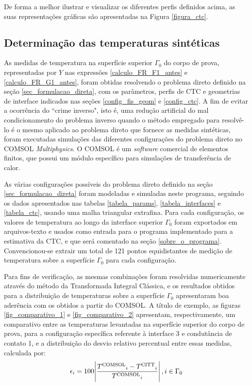 De forma a melhor ilustrar e visualizar os diferentes perfis definidos acima, as suas representações gráficas são apresentadas na Figura \ref{figura_ctc}.
\newpage



\subsection{Determinação das temperaturas sintéticas}

As medidas de temperatura na superfície superior $\Gamma_0$ do corpo de prova, representadas por $Y$ nas expressões \eqref{calculo_FR_F1_antes} e \eqref{calculo_FR_G1_antes}, foram obtidas resolvendo o problema direto definido na seção \ref{sec_formulacao_direta}, com os parâmetros, perfis de CTC e geometrias de interface indicados nas seções \ref{config_fis_geom} e \ref{config_ctc}. A fim de evitar a ocorrência do ``crime inverso", isto é, uma redução artificial do mal condicionamento do problema inverso quando o método empregado para resolvê-lo é o mesmo aplicado ao problema direto que fornece as medidas sintéticas\citep{livro_kaipio}, foram executadas simulações das diferentes configurações do problema direto no COMSOL \textit{Multiphysics}\textsuperscript{\textregistered}. O COMSOL é um \textit{software} comercial de elementos finitos, que possui um módulo específico para simulações de transferência de calor.

As várias configurações possíveis do problema direto definido na seção \ref{sec_formulacao_direta} foram modeladas e simuladas neste programa, seguindo os dados apresentados nas tabelas \ref{tabela_params}, \ref{tabela_interfaces} e \ref{tabela_ctc}, usando uma malha triangular extrafina. Para cada configuração, os valores de temperatura ao longo da interface superior $\Gamma_0$ foram exportados em arquivos-texto e usados como entrada para o programa implementado para a estimativa da CTC, e que será comentado na seção \ref{sobre_o_programa}. Convencionou-se extrair um total de 121 pontos equidistantes de medição de temperatura sobre a superfície $\Gamma_0$ para cada configuração.

Para fins de verificação, as mesmas combinações foram resolvidas numericamente através do método da Transformada Integral Clássica, e os resultados obtidos para a distribuição de temperaturas sobre a superfície $\Gamma_0$ apresentaram boa aderência com os obtidos a partir do COMSOL. A título de exemplo, as figuras \ref{fig_comparativo_1} e \ref{fig_comparativo_2} apresentam, respectivamente, um comparativo entre as temperaturas levantadas na superfície superior do corpo de prova, para a configuração específica referente à interface 3 e condutância de contato 1, e a distribuição do desvio relativo percentual entre essas medidas, calculada por:
\begin{align}
\epsilon_i = 100\abs{\frac{T\textsuperscript{COMSOL}_i - T\textsuperscript{CITT}_i}{T\textsuperscript{COMSOL}_i}}, i \in \Gamma_0
\end{align}

